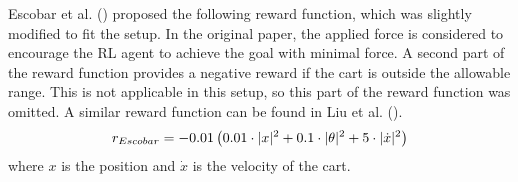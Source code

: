 Escobar et al. (\citeyear{manrique_escobar_parametric_2020}) proposed the following reward function, which was slightly modified to fit the setup. In the original paper, the applied force is considered to encourage the RL agent to achieve the goal with minimal force. A second part of the reward function provides a negative reward if the cart is outside the allowable range. This is not applicable in this setup, so this part of the reward function was omitted. A similar reward function can be found in Liu et al. (\citeyear{liu_swing-up_2023}).
\begin{align}
    r_{Escobar} = -0.01\left(0.01\cdot\vert x\vert^2 + 0.1\cdot\vert\theta\vert^2 + 5\cdot\vert \dot{x}\vert^2\right) \notag
\end{align} 
where $x$ is the position and $\dot{x}$ is the velocity of the cart.

